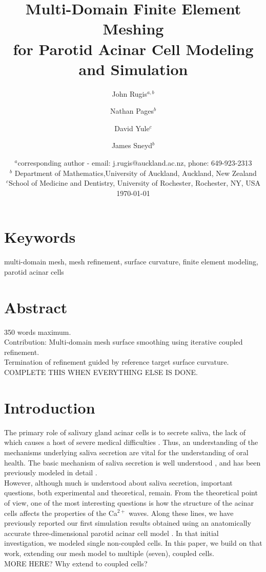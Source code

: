 \documentclass[a4paper,10pt]{article}
\title{Multi-Domain Finite Element Meshing\\for Parotid Acinar Cell Modeling and Simulation}
\author{John Rugis$^{a,b}$ \and Nathan Pages$^b$ \and David Yule$^c$ \and James Sneyd$^b$}
\date{%
  $^a$corresponding author - email: j.rugis@auckland.ac.nz, phone: 649-923-2313\\%
  $^b$ Department of Mathematics,University of Auckland, Auckland, New Zealand\\%
  $^c$School of Medicine and Dentistry, University of Rochester, Rochester, NY, USA\\[2ex]%
  \today
}
\begin{document}
\maketitle

\section*{Keywords}
multi-domain mesh, mesh refinement, surface curvature, finite element modeling, parotid acinar cells\\

\section*{Abstract}
350 words maximum.\\
Contribution: Multi-domain mesh surface smoothing using iterative coupled refinement.\\ 
Termination of refinement guided by reference target surface curvature.\\
COMPLETE THIS WHEN EVERYTHING ELSE IS DONE.\\  

\section{Introduction}
The primary role of salivary gland acinar cells is to secrete saliva, the lack of which causes a host of severe medical difficulties \cite{fox1985,melvin1991}. Thus, an understanding of the mechanisms underlying saliva secretion are vital for the understanding of oral health.  The basic mechanism of saliva secretion is well understood \cite{nauntofte1992}, and has been previously modeled in detail \cite{sneyd2003}.\\

However, although much is understood about saliva secretion, important questions, both experimental and theoretical, remain. From the theoretical point of view, one of the most interesting questions is how the structure of the acinar cells affects the properties of the Ca$^{2+}$ waves. Along these lines, we have previously reported our first simulation results obtained using an anatomically accurate three-dimensional parotid acinar cell model \cite{Sneyd2017383}. In that initial investigation, we modeled single non-coupled cells. In this paper, we build on that work, extending our mesh model to multiple (seven), coupled cells.\\   

MORE HERE? Why extend to coupled cells?\\
\end{document}
